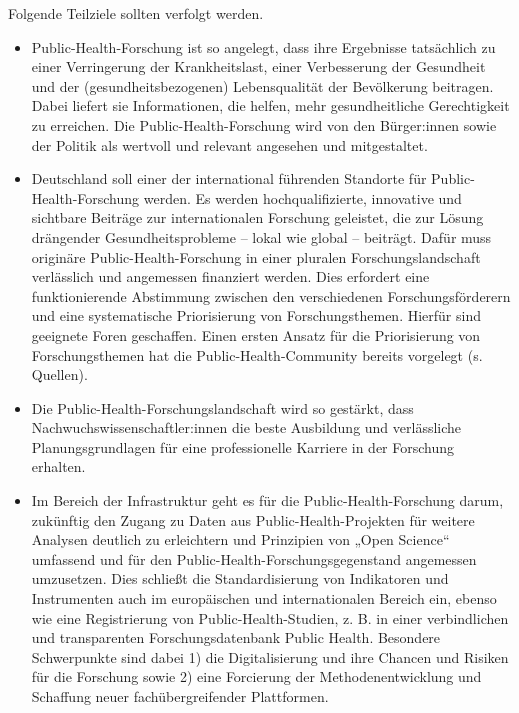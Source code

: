\documentclass{article}
\begin{document}
Folgende Teilziele sollten verfolgt werden.

\begin{itemize}
\item Public-Health-Forschung ist so angelegt, dass ihre Ergebnisse tatsächlich zu einer Verringerung der Krankheitslast, einer Verbesserung der Gesundheit und der (gesundheitsbezogenen) Lebensqualität der Bevölkerung beitragen. Dabei liefert sie Informationen, die helfen, mehr gesundheitliche Gerechtigkeit zu erreichen. Die Public-Health-Forschung wird von den Bürger:innen sowie der Politik als wertvoll und relevant angesehen und mitgestaltet. 


\item Deutschland soll einer der international führenden Standorte für Public-Health-Forschung werden. Es werden hochqualifizierte, innovative und sichtbare Beiträge zur internationalen Forschung geleistet, die zur Lösung drängender Gesundheitsprobleme – lokal wie global – beiträgt. Dafür muss originäre Public-Health-Forschung in einer pluralen Forschungslandschaft verlässlich und angemessen finanziert werden. Dies erfordert eine funktionierende Abstimmung zwischen den verschiedenen Forschungsförderern und eine systematische Priorisierung von Forschungsthemen. Hierfür sind geeignete Foren geschaffen. Einen ersten Ansatz für die Priorisierung von Forschungsthemen hat die Public-Health-Community bereits vorgelegt (s. Quellen).


\item Die Public-Health-Forschungslandschaft wird so gestärkt, dass Nachwuchswissenschaftler:innen die beste Ausbildung und verlässliche Planungsgrundlagen für eine professionelle Karriere in der Forschung erhalten.


\item Im Bereich der Infrastruktur geht es für die Public-Health-Forschung darum, zukünftig den Zugang zu Daten aus Public-Health-Projekten für weitere Analysen deutlich zu erleichtern und Prinzipien von „Open Science“ umfassend und für den Public-Health-Forschungsgegenstand angemessen umzusetzen. Dies schließt die Standardisierung von Indikatoren und Instrumenten auch im europäischen und internationalen Bereich ein, ebenso wie eine Registrierung von Public-Health-Studien, z. B. in einer verbindlichen und transparenten Forschungsdatenbank Public Health. Besondere Schwerpunkte sind dabei 1) die Digitalisierung und ihre Chancen und Risiken für die Forschung sowie 2) eine Forcierung der Methodenentwicklung und Schaffung neuer fachübergreifender Plattformen.



\end{itemize}
\end{document}
